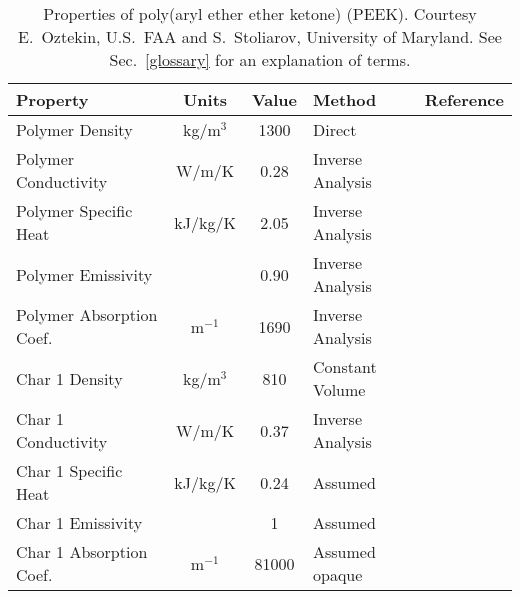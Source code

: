 \begin{table}[p]
\caption[Properties of poly(aryl ether ether ketone) (PEEK)]{Properties of poly(aryl ether ether ketone) (PEEK). Courtesy E.~Oztekin, U.S.~FAA and S.~Stoliarov,
University of Maryland. See Sec.~\ref{glossary} for an explanation of terms.}
\begin{center}
\begin{tabular}{|l|c|c|l|l|}
\hline
Property                    & Units         & Value                             & Method                    &  Reference                              \\ \hline \hline
Polymer Density             & kg/m$^3$      & 1300                              & Direct                    &  \cite{Oztekin:CF2012}                  \\ \hline
Polymer Conductivity        & W/m/K         & 0.28                              & Inverse Analysis          &  \cite{Oztekin:CF2012}                  \\ \hline
Polymer Specific Heat       & kJ/kg/K       & 2.05                              & Inverse Analysis          &  \cite{Oztekin:CF2012}                  \\ \hline
Polymer Emissivity          &               & 0.90                              & Inverse Analysis          &  \cite{Oztekin:CF2012}                  \\ \hline
Polymer Absorption Coef.    & m$^{-1}$      & 1690                              & Inverse Analysis          &  \cite{Oztekin:CF2012}                  \\ \hline
Char 1 Density              & kg/m$^3$      & 810                               & Constant Volume           &  \cite{Oztekin:CF2012}                  \\ \hline
Char 1 Conductivity         & W/m/K         & 0.37                              & Inverse Analysis          &  \cite{Oztekin:CF2012}                  \\ \hline
Char 1 Specific Heat        & kJ/kg/K       & 0.24                              & Assumed                   &  \cite{Oztekin:CF2012}                  \\ \hline
Char 1 Emissivity           &               & 1                                 & Assumed                   &  \cite{Oztekin:CF2012}                  \\ \hline
Char 1 Absorption Coef.     & m$^{-1}$      & 81000                             & Assumed opaque            &  \cite{Oztekin:CF2012}                  \\ \hline

\end{tabular}
\end{center}
\end{table}
